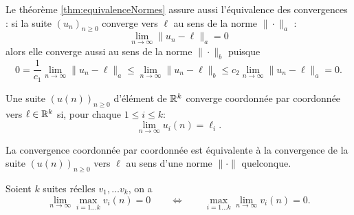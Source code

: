 \remark
Le théorème \ref{thm:equivalenceNormes} assure aussi l'équivalence des convergences : si la suite $(u_n)_{n \geq 0}$ converge vers $\ell$ au sens de la norme $\|\cdot\|_a$ :
$$
\lim_{n \rightarrow \infty} \|u_n - \ell\|_a = 0
$$
alors elle converge aussi au sens de la norme $\|\cdot\|_b$ puisque
$$
0 = \frac1{c_1} \lim_{n \rightarrow \infty} \|u_n - \ell\|_a
\leq \lim_{n \rightarrow \infty} \|u_n - \ell\|_b \leq
c_2 \lim_{n \rightarrow \infty} \|u_n - \ell\|_a = 0.
$$

\begin{definition}
  Une suite $(u(n))_{n \geq 0}$ d'élément de $\mathbb{R}^k$ converge coordonnée par coordonnée vers $\ell \in \mathbb{R}^k$ si, pour chaque $1 \leq i \leq k$:
  $$
  \lim_{n \rightarrow \infty} u_i(n) = \ell_i.
  $$
\end{definition}

\begin{proposition} \label{prop:convergenceParCoordonnee}
  La convergence coordonnée par coordonnée est équivalente à la convergence de la suite $(u(n))_{n \geq 0}$ vers $\ell$ au sens d'une norme $\|\cdot\|$ quelconque.
\end{proposition}

\begin{lemma} \label{lem:inversionLimiteMaximum}
  Soient $k$ suites réelles $v_1, \dots v_k$, on a
  $$
  \lim_{n \rightarrow \infty} \max_{i=1 \dots k} v_i(n) = 0
  \qquad \Leftrightarrow \qquad
  \max_{i=1 \dots k} \lim_{n \rightarrow \infty} v_i(n) = 0.
  $$
\end{lemma}

